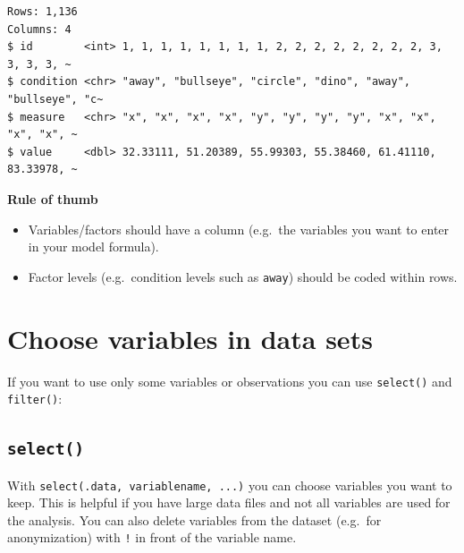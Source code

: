 \documentclass[
  letterpaper,
  DIV=11,
  numbers=noendperiod,
  oneside]{scrreprt}
\begin{document}
\begin{verbatim}
Rows: 1,136
Columns: 4
$ id        <int> 1, 1, 1, 1, 1, 1, 1, 1, 2, 2, 2, 2, 2, 2, 2, 2, 3, 3, 3, 3, ~
$ condition <chr> "away", "bullseye", "circle", "dino", "away", "bullseye", "c~
$ measure   <chr> "x", "x", "x", "x", "y", "y", "y", "y", "x", "x", "x", "x", ~
$ value     <dbl> 32.33111, 51.20389, 55.99303, 55.38460, 61.41110, 83.33978, ~
\end{verbatim}

\begin{tcolorbox}[enhanced jigsaw, colframe=quarto-callout-tip-color-frame, bottomrule=.15mm, left=2mm, arc=.35mm, toprule=.15mm, opacityback=0, colback=white, rightrule=.15mm, breakable, leftrule=.75mm]
\begin{minipage}[t]{5.5mm}
\textcolor{quarto-callout-tip-color}{\faLightbulb}
\end{minipage}%
\begin{minipage}[t]{\textwidth - 5.5mm}

\textbf{Rule of thumb}\vspace{2mm}

\begin{itemize}
\item
  Variables/factors should have a column (e.g.~the variables you want to
  enter in your model formula).
\item
  Factor levels (e.g.~condition levels such as \texttt{away}) should be
  coded within rows.
\end{itemize}

\end{minipage}%
\end{tcolorbox}

\hfill\break

\hypertarget{choose-variables-in-data-sets}{%
\section{Choose variables in data
sets}\label{choose-variables-in-data-sets}}

If you want to use only some variables or observations you can use
\texttt{select()} and \texttt{filter()}:

\hypertarget{select}{%
\subsection{\texorpdfstring{\texttt{select()}}{select()}}\label{select}}

With \texttt{select(.data,\ variablename,\ ...)} you can choose
variables you want to keep. This is helpful if you have large data files
and not all variables are used for the analysis. You can also delete
variables from the dataset (e.g.~for anonymization) with \texttt{!} in
front of the variable name.
\end{document}
